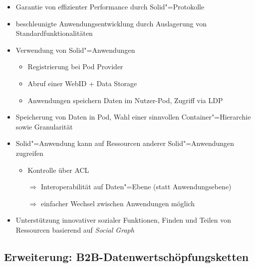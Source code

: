 \begin{itemize}
    \item Garantie von effizienter Performance durch Solid"=Protokolle~\cite{sambraSolidPlatformDecentralized2016}
    \item beschleunigte Anwendungsentwicklung durch Auslagerung von Standardfunktionalitäten~\cite{sambraSolidPlatformDecentralized2016}
    
    \item Verwendung von Solid"=Anwendungen~\cite{sambraSolidPlatformDecentralized2016}
    \begin{itemize}
        \item Registrierung bei Pod Provider
        \item Abruf einer WebID + Data Storage
        \item Anwendungen speichern Daten im Nutzer-Pod, Zugriff via LDP
    \end{itemize}

    \item Speicherung von Daten in Pod, Wahl einer sinnvollen Container"=Hierarchie sowie Granularität~\cite{sambraSolidPlatformDecentralized2016}

    \item Solid"=Anwendung kann auf Ressourcen anderer Solid"=Anwendungen zugreifen~\cite{sambraSolidPlatformDecentralized2016}
    \begin{itemize}
        \item Kontrolle über ACL~\cite{sambraSolidPlatformDecentralized2016}
        \item[$\Rightarrow$] Interoperabilität auf Daten"=Ebene (statt Anwendungsebene)~\cite{sambraSolidPlatformDecentralized2016}
        \item[$\Rightarrow$] einfacher Wechsel zwischen Anwendungen möglich~\cite{sambraSolidPlatformDecentralized2016}
    \end{itemize}

    \item Unterstützung innovativer sozialer Funktionen, Finden und Teilen von Ressourcen basierend auf \emph{Social Graph}~\cite{sambraSolidPlatformDecentralized2016}
\end{itemize}


\subsection{Erweiterung: B2B-Datenwertschöpfungsketten}

